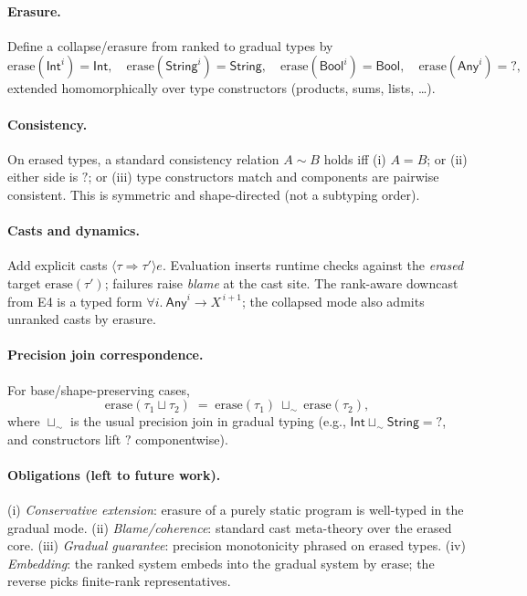 \paragraph{Erasure.}
Define a collapse/erasure from ranked to gradual types by
\[
\mathrm{erase}(\mathsf{Int}^{i})=\mathsf{Int},\quad
\mathrm{erase}(\mathsf{String}^{i})=\mathsf{String},\quad
\mathrm{erase}(\mathsf{Bool}^{i})=\mathsf{Bool},\quad
\mathrm{erase}(\mathsf{Any}^{i})=?,
\]
extended homomorphically over type constructors (products, sums, lists, \dots).

\paragraph{Consistency.}
On erased types, a standard consistency relation \(A \mathrel{\sim} B\) holds iff
(i) \(A=B\); or (ii) either side is \(?\); or (iii) type constructors match and components are pairwise consistent.
This is symmetric and shape-directed (not a subtyping order).

\paragraph{Casts and dynamics.}
Add explicit casts \(\langle \tau \Rightarrow \tau'\rangle e\).
Evaluation inserts runtime checks against the \emph{erased} target \(\mathrm{erase}(\tau')\);
failures raise \emph{blame} at the cast site.
The rank-aware downcast from \textsc{E4} is a typed form
\(\forall i.\ \mathsf{Any}^{i} \to X^{\,i+1}\);
the collapsed mode also admits unranked casts by erasure.

\paragraph{Precision join correspondence.}
For base/shape-preserving cases,
\[
\mathrm{erase}(\tau_1 \sqcup \tau_2)
\;=\;
\mathrm{erase}(\tau_1)\ \sqcup_{\!\sim}\ \mathrm{erase}(\tau_2),
\]
where \(\sqcup_{\!\sim}\) is the usual precision join in gradual typing (e.g., \(\mathsf{Int}\sqcup_{\!\sim}\mathsf{String}=?\), and constructors lift \(?\) componentwise).

\paragraph{Obligations (left to future work).}
(i) \emph{Conservative extension}: erasure of a purely static program is well-typed in the gradual mode. 
(ii) \emph{Blame/coherence}: standard cast meta-theory over the erased core. 
(iii) \emph{Gradual guarantee}: precision monotonicity phrased on erased types. 
(iv) \emph{Embedding}: the ranked system embeds into the gradual system by \(\mathrm{erase}\); the reverse picks finite-rank representatives.

